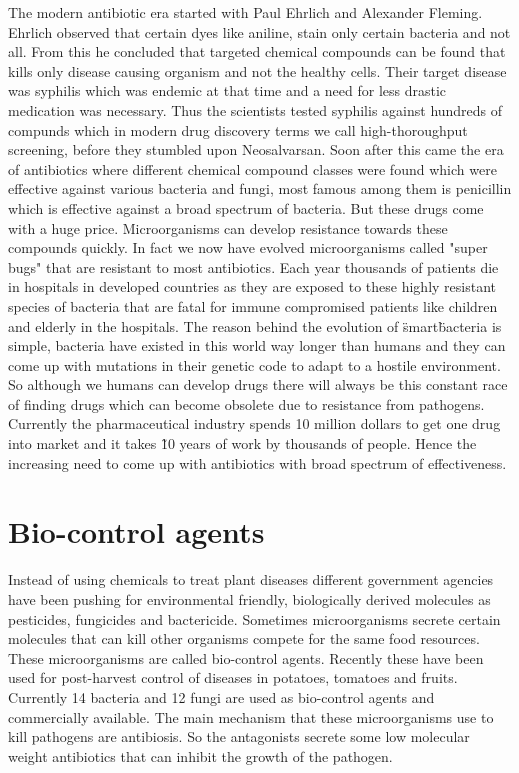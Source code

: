 The modern antibiotic era started with Paul Ehrlich and Alexander Fleming. 
Ehrlich observed that certain dyes like aniline, stain only certain bacteria and not all. 
From this he concluded that targeted chemical compounds can be found that 
kills only disease causing organism and not the healthy cells. 
Their target disease was syphilis which was endemic at that time and a need for less drastic medication
was necessary. Thus the scientists tested syphilis against hundreds of 
compunds which in   modern drug discovery terms we call high-thoroughput screening, before they stumbled upon 
Neosalvarsan.\cite{Hata1910}
Soon after this came the era of antibiotics where different chemical compound classes were 
found which were effective against various bacteria and fungi, most famous among them is penicillin which is effective against a broad spectrum of bacteria.\cite{Fleming1929}
But these drugs come with a huge price. Microorganisms can develop resistance towards 
these compounds quickly. In fact we now have evolved microorganisms called "super bugs" that 
are resistant to most antibiotics. Each year thousands of patients die in 
hospitals in developed countries as they are exposed to these highly resistant species of 
bacteria that are fatal for immune compromised patients like children and elderly in the hospitals. The reason behind the evolution of \"smart\" bacteria is simple, bacteria have existed in this world way longer than humans and they can come up with 
mutations in their genetic code to adapt to a hostile environment. So although we humans 
can develop drugs there will always be this constant race of finding drugs which can become
obsolete due to resistance from pathogens. \cite{Davies2010} 
Currently the pharmaceutical industry spends 10 million dollars to get one drug into market and it takes \~ 10 years of work by thousands of people. Hence the 
increasing need to come up with antibiotics with broad spectrum of effectiveness.


\section{Bio-control agents}
Instead of using chemicals to treat plant diseases different government agencies have been pushing for environmental friendly, biologically derived molecules as pesticides, fungicides and bactericide.
Sometimes microorganisms secrete certain molecules
that can kill other organisms compete for the same food resources. 
These microorganisms are called bio-control agents.\cite{Wilson2009}
Recently these have been used for post-harvest control of diseases in 
potatoes, tomatoes and fruits. 
Currently 14 bacteria and 12 fungi are used as bio-control agents and 
commercially available.\cite{Fravel2005}
The main mechanism that these microorganisms use to kill pathogens are 
antibiosis. So the antagonists secrete some low molecular weight 
antibiotics that can inhibit the growth of the 
pathogen.\cite{Lynch2005}

